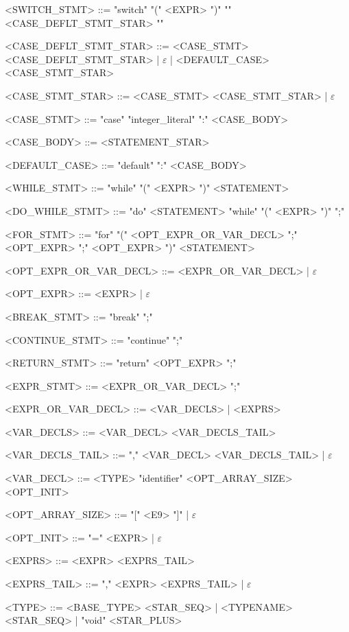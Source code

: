 \begin{grammar}
<SWITCH\_STMT> ::= "switch" "(" <EXPR> ")" "{" <CASE\_DEFLT\_STMT\_STAR> "}"

<CASE\_DEFLT\_STMT\_STAR> ::= <CASE\_STMT> <CASE\_DEFLT\_STMT\_STAR>
                            | $\varepsilon$
                            | <DEFAULT\_CASE> <CASE\_STMT\_STAR>

<CASE\_STMT\_STAR> ::= <CASE\_STMT> <CASE\_STMT\_STAR>
                     | $\varepsilon$

<CASE\_STMT> ::= "case" "integer_literal" ":" <CASE\_BODY>

<CASE\_BODY> ::= <STATEMENT\_STAR>

<DEFAULT\_CASE> ::= "default" ":" <CASE\_BODY>

<WHILE\_STMT> ::= "while" "(" <EXPR> ")" <STATEMENT>

<DO\_WHILE\_STMT> ::= "do" <STATEMENT> "while" "(" <EXPR> ")" ";"

<FOR\_STMT> ::= "for" "(" <OPT\_EXPR\_OR\_VAR\_DECL> ";" <OPT\_EXPR> ";" <OPT\_EXPR> ")" <STATEMENT>

<OPT\_EXPR\_OR\_VAR\_DECL> ::= <EXPR\_OR\_VAR\_DECL>
                             | $\varepsilon$

<OPT\_EXPR> ::= <EXPR>
              | $\varepsilon$

<BREAK\_STMT> ::= "break" ";"

<CONTINUE\_STMT> ::= "continue" ";"

<RETURN\_STMT> ::= "return" <OPT\_EXPR> ";"

<EXPR\_STMT> ::= <EXPR\_OR\_VAR\_DECL> ";"

<EXPR\_OR\_VAR\_DECL> ::= <VAR\_DECLS>
                        | <EXPRS>

<VAR\_DECLS> ::= <VAR\_DECL> <VAR\_DECLS\_TAIL>

<VAR\_DECLS\_TAIL> ::= "," <VAR\_DECL> <VAR\_DECLS\_TAIL>
                     | $\varepsilon$

<VAR\_DECL> ::= <TYPE> "identifier" <OPT\_ARRAY\_SIZE> <OPT\_INIT>

<OPT\_ARRAY\_SIZE> ::= "[" <E9> "]"
                     | $\varepsilon$

<OPT\_INIT> ::= "=" <EXPR>
              | $\varepsilon$

<EXPRS> ::= <EXPR> <EXPRS\_TAIL>

<EXPRS\_TAIL> ::= "," <EXPR> <EXPRS\_TAIL>
                | $\varepsilon$

<TYPE> ::= <BASE\_TYPE> <STAR\_SEQ>
         | <TYPENAME> <STAR\_SEQ>
         | "void" <STAR\_PLUS>


\end{grammar}
